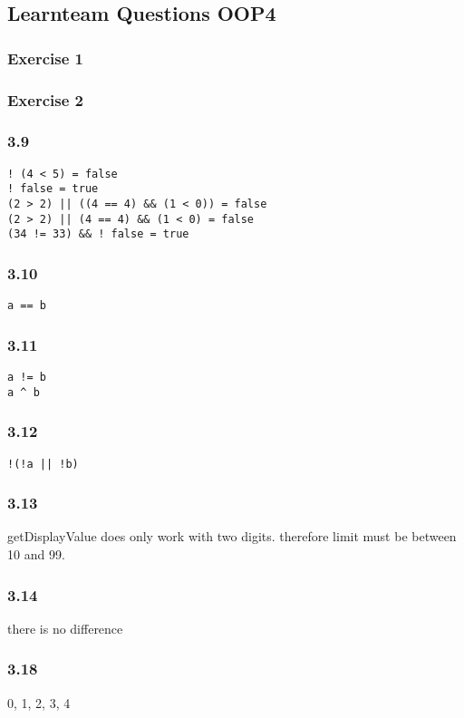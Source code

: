 \subsection{Learnteam Questions OOP4}

\subsubsection*{Exercise 1}


\subsubsection*{Exercise 2}
\subsubsection*{3.9}
\begin{lstlisting}
! (4 < 5) = false
! false = true
(2 > 2) || ((4 == 4) && (1 < 0)) = false
(2 > 2) || (4 == 4) && (1 < 0) = false
(34 != 33) && ! false = true
\end{lstlisting}
\subsubsection*{3.10}
\begin{lstlisting}
a == b
\end{lstlisting}
\subsubsection*{3.11}
\begin{lstlisting}
a != b
a ^ b
\end{lstlisting}
\subsubsection*{3.12}
\begin{lstlisting}
!(!a || !b)
\end{lstlisting}
\subsubsection*{3.13}
getDisplayValue does only work with two digits. therefore limit must be 
between 10 and 99. 
\subsubsection*{3.14}
there is no difference
\subsubsection*{3.18}
0, 1, 2, 3, 4

